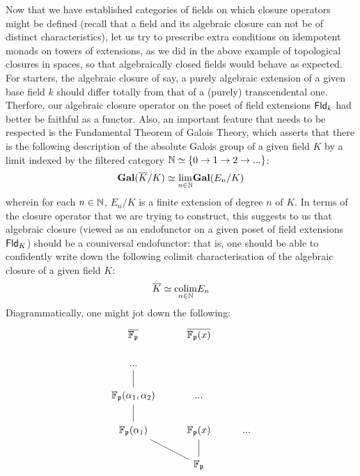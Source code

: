 \begin{example}
\begin{enumerate}
                            Now that we have established categories of fields on which closure operators might be defined (recall that a field and its algebraic closure can not be of distinct characteristics), let us try to prescribe extra conditions on idempotent monads on towers of extensions, as we did in the above example of topological closures in spaces, so that algebraically closed fields would behave as expected. For starters, the algebraic closure of say, a purely algebraic extension of a given base field $k$ should differ totally from that of a (purely) transcendental one. Therfore, our algebraic closure operator on the poset of field extensions $\Fld_k$ had better be faithful as a functor. Also, an important feature that needs to be respected is the Fundamental Theorem of Galois Theory, which asserts that there is the following description of the absolute Galois group of a given field $K$ by a limit indexed by the filtered category $\N \cong \{0 \to 1 \to 2 \to ...\}$:
                                $$\Gal(\overline{K}/K) \cong \underset{n \in \N}{\lim} \Gal(E_n/K)$$
                            wherein for each $n \in \N$, $E_n/K$ is a finite extension of degree $n$ of $K$. In terms of the closure operator that we are trying to construct, this suggests to us that algebraic closure (viewed as an endofunctor on a given poset of field extensions $\Fld_K$) should be a couniversal endofunctor: that is, one should be able to confidently write down the following colimit characterisation of the algebraic closure of a given field $K$:
                                $$\overline{K} \cong \underset{n \in \N}{\colim} E_n$$
                            Diagrammatically, one might jot down the following:
                                $$
                                    \begin{tikzcd}
                                    	{\overline{\F_{\p}}} & {\overline{\F_{\p}(x)}} \\
                                    	{...} & {} \\
                                    	{\F_{\p}(\alpha_1, \alpha_2)} & {...} \\
                                    	{\F_{\p}(\alpha_1)} & {\F_{\p}(x)} & {...} \\
                                    	& {\F_{\p}}
                                    	\arrow[no head, from=3-1, to=2-1]
                                    	\arrow[no head, from=4-1, to=3-1]
                                    	\arrow[no head, from=5-2, to=4-1]
                                    	\arrow[no head, from=5-2, to=4-2]

\end{tikzcd}$$
\end{enumerate}
\end{example}
